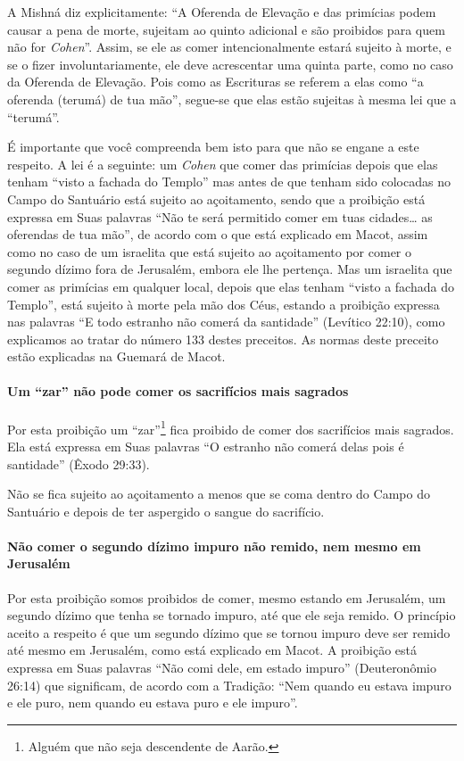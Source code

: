 A Mishná diz explicitamente: ``A Oferenda de Elevação e das primícias
podem causar a pena de morte, sujeitam ao quinto adicional e são
proibidos para quem não for \textit{Cohen}''. Assim, se ele as comer
intencionalmente estará sujeito à morte, e se o fizer
involuntariamente, ele deve acrescentar uma quinta parte, como no caso
da Oferenda de Elevação. Pois como as Escrituras se referem a elas como
``a oferenda (terumá) de tua mão'', segue-se que elas estão sujeitas à
mesma lei que a ``terumá''.

É importante que você compreenda bem isto para que não se engane a este
respeito. A lei é a seguinte: um \textit{Cohen} que comer das primícias
depois que elas tenham ``visto a fachada do Templo'' mas antes de que
tenham sido colocadas no Campo do Santuário está sujeito ao açoitamento,
sendo que a proibição está expressa em Suas palavras ``Não te será
permitido comer em tuas cidades\ldots{} as oferendas de tua mão'', de acordo
com o que está explicado em Macot, assim como no caso de um israelita
que está sujeito ao açoitamento por comer o segundo dízimo fora de
Jerusalém, embora ele lhe pertença. Mas um israelita que comer as
primícias em qualquer local, depois que elas tenham
``visto a fachada do Templo'', está sujeito à morte pela mão dos Céus,
estando
a proibição expressa nas palavras ``E todo estranho não comerá da
santidade'' (Levítico 22:10), como explicamos ao tratar do número 133
destes preceitos.
As normas deste preceito estão explicadas na Guemará de Macot.

\paragraph{Um ``zar'' não pode comer os sacrifícios mais sagrados}

Por esta proibição um ``zar''\footnote{Alguém que não seja descendente de Aarão.} fica proibido de
comer dos sacrifícios mais sagrados. Ela está expressa em Suas palavras
``O estranho não comerá delas pois é santidade'' (Êxodo 29:33).

Não se fica sujeito ao açoitamento a menos que se coma dentro do Campo
do Santuário e depois de ter aspergido o sangue do sacrifício.

\paragraph{Não comer o segundo dízimo impuro não remido, nem mesmo em Jerusalém}

Por esta proibição somos proibidos de comer, mesmo estando em Jerusalém,
um segundo dízimo que tenha se tornado impuro, até que ele seja remido.
O princípio aceito a respeito é que um segundo dízimo que se tornou
impuro deve ser remido até mesmo em Jerusalém, como está explicado em
Macot. A proibição está expressa em Suas palavras ``Não comi dele, em
estado impuro'' (Deuteronômio 26:14) que significam, de acordo com a
Tradição: ``Nem quando eu estava impuro e ele puro, nem quando eu estava
puro e ele impuro''.

